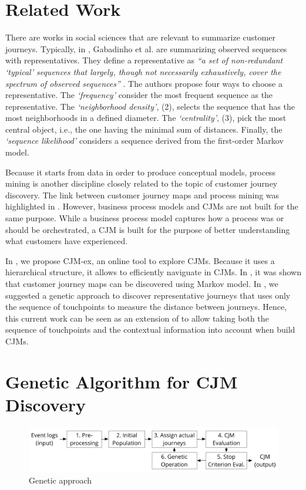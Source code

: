 \documentclass[runningheads]{llncs}
\begin{document}
{\section{Related Work}
There are works in social sciences that are relevant to summarize customer journeys. Typically, in \cite{gabadinho2009summarizing,gabadinho2009extracting}, Gabadinho et al. are summarizing observed sequences with representatives. They define a representative as {\it``a set of non-redundant `typical' sequences that largely, though not necessarily exhaustively, cover the spectrum of observed sequences''} \cite{gabadinho2009summarizing}. The authors propose four ways to choose a representative. The {\it `frequency'} consider the most frequent sequence as the representative. The {\it `neighborhood density'}, (2), selects the sequence that has the most neighborhoods in a defined diameter. The {\it `centrality'}, (3), pick the most central object, i.e., the one having the minimal sum of distances. Finally, the {\it `sequence likelihood'} considers a sequence derived from the first-order Markov model. 

Because it starts from data in order to produce conceptual models, process mining is another discipline closely related to the topic of customer journey discovery. The link between customer journey maps and process mining was highlighted in \cite{bernard2017cjm}. However, business process models and CJMs are not built for the same purpose. While a business process model captures how a process was or should be orchestrated, a CJM is built for the purpose of better understanding what customers have experienced. 

In \cite{bernard2017cjmEX}, we propose CJM-ex, an online tool to explore CJMs. Because it uses a hierarchical structure, it allows to efficiently naviguate in CJMs. In \cite{bernard2017Markov}, it was shown that customer journey maps can be discovered using Markov model. In \cite{bernard2019genetic}, we suggested a genetic approach to discover representative journeys that uses only the sequence of touchpoints to measure the distance between journeys. Hence, this current work can be seen as an extension of \cite{bernard2019genetic} to allow taking both the sequence of touchpoints and the contextual information into account when build CJMs. 


\section{Genetic Algorithm for CJM Discovery}
\begin{figure}[H]
\centering
\includegraphics[width=0.95\columnwidth]{05_schema/process.pdf}
  \caption{Genetic approach}
  \label{fig:process}
\end{figure}

}
\end{document}
